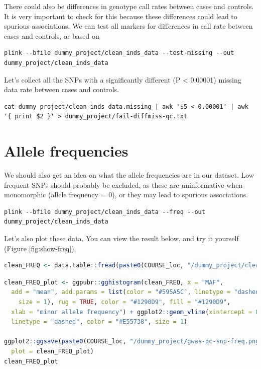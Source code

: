 \documentclass[
]{book}
\begin{document}
There could also be differences in genotype call rates between cases and controls. It is very important to check for this because these differences could lead to spurious associations. We can test all markers for differences in call rate between cases and controls, or based on

\begin{lstlisting}
plink --bfile dummy_project/clean_inds_data --test-missing --out dummy_project/clean_inds_data
\end{lstlisting}

Let's collect all the SNPs with a significantly different (P \textless{} 0.00001) missing data rate between cases and controls.

\begin{lstlisting}
cat dummy_project/clean_inds_data.missing | awk '$5 < 0.00001' | awk '{ print $2 }' > dummy_project/fail-diffmiss-qc.txt
\end{lstlisting}

\hypertarget{allele-frequencies}{%
\section{Allele frequencies}\label{allele-frequencies}}

We should also get an idea on what the allele frequencies are in our dataset. Low frequent SNPs should probably be excluded, as these are uninformative when monomorphic (allele frequency = 0), or they may lead to spurious associations.

\begin{lstlisting}
plink --bfile dummy_project/clean_inds_data --freq --out dummy_project/clean_inds_data
\end{lstlisting}

Let's also plot these data. You can view the result below, and try it yourself (Figure \ref{fig:show-freq}).

\begin{lstlisting}[language=R]
clean_FREQ <- data.table::fread(paste0(COURSE_loc, "/dummy_project/clean_inds_data.frq"))
\end{lstlisting}

\begin{lstlisting}[language=R]
clean_FREQ_plot <- ggpubr::gghistogram(clean_FREQ, x = "MAF",
  add = "mean", add.params = list(color = "#595A5C", linetype = "dashed",
    size = 1), rug = TRUE, color = "#1290D9", fill = "#1290D9",
  xlab = "minor allele frequency") + ggplot2::geom_vline(xintercept = 0.05,
  linetype = "dashed", color = "#E55738", size = 1)

ggplot2::ggsave(paste0(COURSE_loc, "/dummy_project/gwas-qc-snp-freq.png"),
  plot = clean_FREQ_plot)
clean_FREQ_plot
\end{lstlisting}
\end{document}
